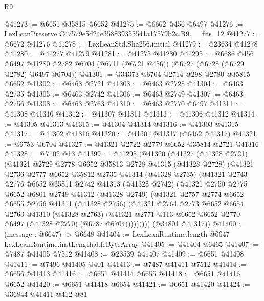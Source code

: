 \begin{lexlean}{R9}
\begin{coremodule}
@41273 := @6651 @35815 @6652
@41275 := @6662 @456 @6497
@41276 := LexLeanPreserve.C47579e5d24e358839355541a17579b2c.R9.__fits_12
@41277 := @6672 @41276
@41278 := LexLeanStd.Sha256.initial
@41279 := @23634 @41278
@41280 := @41277 @41279
@41281 := @41275 @41280
@41295 := @6686
    @456
    @6497
    @41280
    @2782
    @6704
    (@6711 (@6721 @456))
    (@6727 (@6728 (@6729 @2782) @6497 @6704))
@41301 := @34373 @6704 @2714 @298 @2780 @35815 @6652
@41302 := @6463 @2721
@41303 := @6463 @2728
@41304 := @6463 @2735
@41305 := @6463 @2742
@41306 := @6463 @2749
@41307 := @6463 @2756
@41308 := @6463 @2763
@41310 := @6463 @2770 @6497
@41311 := @41308 @41310
@41312 := @41307 @41311
@41313 := @41306 @41312
@41314 := @41305 @41313
@41315 := @41304 @41314
@41316 := @41303 @41315
@41317 := @41302 @41316
@41320 := @41301 @41317 (@6462 @41317)
@41321 := @6753 @6704
@41327 := @41321 @2722 @2779 @6652 @35814 @2721 @41316
@41328 := @7102 @13
@41399 := @41295
    (@41320
      (@41327
        (@41328 @2721)
        (@41321
          @2729
          @2778
          @6652
          @35813
          @2728
          @41315
          (@41328 @2728)
          (@41321
            @2736
            @2777
            @6652
            @35812
            @2735
            @41314
            (@41328 @2735)
            (@41321
              @2743
              @2776
              @6652
              @35811
              @2742
              @41313
              (@41328 @2742)
              (@41321
                @2750
                @2775
                @6652
                @6801
                @2749
                @41312
                (@41328 @2749)
                (@41321
                  @2757
                  @2774
                  @6652
                  @6655
                  @2756
                  @41311
                  (@41328 @2756)
                  (@41321
                    @2764
                    @2773
                    @6652
                    @6654
                    @2763
                    @41310
                    (@41328 @2763)
                    (@41321 @2771 @113 @6652 @6652 @2770 @6497 (@41328 @2770) (@6787 @6704)))))))))
      (@34801 @41317))
@41400 := (message : @6647) -> @6648
@41404 := LexLeanRuntime.length @6647 LexLeanRuntime.instLengthableByteArray
@41405 := @41404 @6465
@41407 := @7487 @41405 @7512
@41408 := @23539 @41407
@41409 := @6651 @41408
@41411 := @7496 @41405 @401
@41413 := @7487 @41411 @7512
@41414 := @6656 @41413
@41416 := @6651 @41414 @6655
@41418 := @6651 @41416 @6652
@41420 := @6651 @41418 @6654
@41421 := @6651 @41420
@41424 := @36844 @41411 @412 @81

\end{coremodule}
\end{lexlean}
